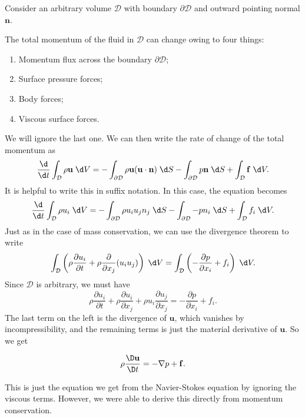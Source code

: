 \documentclass[a4paper]{article}
\begin{document}
Consider an arbitrary volume $\mathcal{D}$ with boundary $\partial \mathcal{D}$ and outward pointing normal $\mathbf{n}$.
\begin{center}
\end{center}
The total momentum of the fluid in $\mathcal{D}$ can change owing to four things:
\begin{enumerate}
  \item Momentum flux across the boundary $\partial \mathcal{D}$;
  \item Surface pressure forces;
  \item Body forces;
  \item Viscous surface forces.
\end{enumerate}
We will ignore the last one. We can then write the rate of change of the total momentum as
\[
  \frac{\d}{\d t} \int_{\mathcal{D}} \rho \mathbf{u} \;\d V = -\int_{\partial \mathcal{D}} \rho \mathbf{u} (\mathbf{u}\cdot \mathbf{n}) \;\d S - \int_{\partial \mathcal{D}} p \mathbf{n}\;\d S + \int_{\mathcal{D}} \mathbf{f}\;\d V.
\]
It is helpful to write this in suffix notation. In this case, the equation becomes
\[
  \frac{\d}{\d t} \int_{\mathcal{D}} \rho u_i \;\d V = -\int_{\partial \mathcal{D}} \rho u_i u_j n_j \;\d S - \int_{\partial \mathcal{D}} - p n_i \;\d S + \int_{\mathcal{D}} f_i \;\d V.
\]
Just as in the case of mass conservation, we can use the divergence theorem to write
\[
  \int_{\mathcal{D}} \left(\rho \frac{\partial u_i}{\partial t} + \rho \frac{\partial}{\partial x_j} (u_i u_j)\right)\;\d V = \int_{\mathcal{D}} \left(-\frac{\partial p}{\partial x_i} + f_i\right) \;\d V.
\]
Since $\mathcal{D}$ is arbitrary, we must have
\[
  \rho \frac{\partial u_i}{\partial t} + \rho \frac{\partial u_i}{\partial x_j} + \rho u_i \frac{\partial u_j}{\partial x_j} = -\frac{\partial p}{\partial x_i} + f_i.
\]
The last term on the left is the divergence of $\mathbf{u}$, which vanishes by incompressibility, and the remaining terms is just the material derivative of $\mathbf{u}$. So we get
\begin{prop}
  \[
    \rho \frac{\D \mathbf{u}}{\D t} = - \nabla p + \mathbf{f}.
  \]
\end{prop}
This is just the equation we get from the Navier-Stokes equation by ignoring the viscous terms. However, we were able to derive this directly from momentum conservation.
\end{document}
